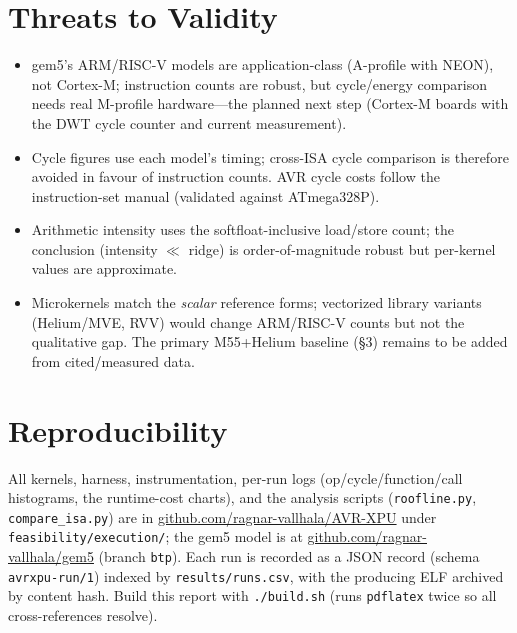 \documentclass[11pt]{article}
\newcommand{\code}[1]{\texttt{#1}}
\begin{document}
\section{Threats to Validity}
\begin{itemize}
  \item gem5's ARM/RISC-V models are application-class (A-profile with NEON), not Cortex-M; instruction
  counts are robust, but cycle/energy comparison needs real M-profile hardware---the planned next step
  (Cortex-M boards with the DWT cycle counter and current measurement).
  \item Cycle figures use each model's timing; cross-ISA cycle comparison is therefore avoided in favour
  of instruction counts. AVR cycle costs follow the instruction-set manual (validated against ATmega328P).
  \item Arithmetic intensity uses the softfloat-inclusive load/store count; the conclusion (intensity
  $\ll$ ridge) is order-of-magnitude robust but per-kernel values are approximate.
  \item Microkernels match the \emph{scalar} reference forms; vectorized library variants (Helium/MVE,
  RVV) would change ARM/RISC-V counts but not the qualitative gap. The primary M55+Helium baseline (\S3)
  remains to be added from cited/measured data.
\end{itemize}

\section*{Reproducibility}
All kernels, harness, instrumentation, per-run logs (op/cycle/function/call histograms, the runtime-cost
charts), and the analysis scripts (\code{roofline.py}, \code{compare\_isa.py}) are in
\href{https://github.com/ragnar-vallhala/AVR-XPU}{github.com/ragnar-vallhala/AVR-XPU} under
\code{feasibility/execution/}; the gem5 model is at
\href{https://github.com/ragnar-vallhala/gem5}{github.com/ragnar-vallhala/gem5} (branch \code{btp}).
Each run is recorded as a JSON record (schema \code{avrxpu-run/1}) indexed by \code{results/runs.csv}, with
the producing ELF archived by content hash. Build this report with \code{./build.sh} (runs \code{pdflatex}
twice so all cross-references resolve).
\end{document}
